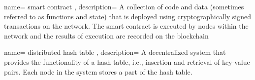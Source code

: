 {
    name={
        smart contract
    },
    description={
        A collection of code and data (sometimes referred to as functions and state)
        that is deployed using cryptographically signed transactions on the network.
        The smart contract is executed by nodes within the network and the results of
        execution are recorded on the blockchain\supercite{Lesavre2021-xs} \supercite{Yaga2018-ko}
    }
}

{
    name={
        distributed hash table
    },
    description={
        A decentralized system that provides the functionality of a hash table, i.e., insertion
        and retrieval of key-value pairs. Each node in the system stores a part of the hash table.
        \supercite{Galuba2009-he}
    }
}




